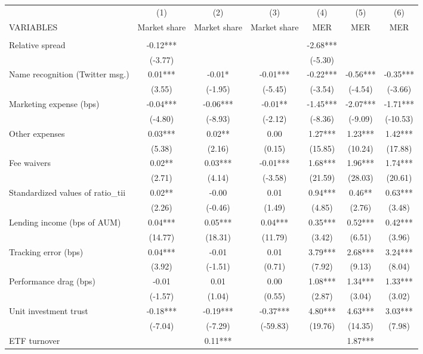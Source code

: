 \documentclass[]{article}
\begin{document}
\begin{tabular}{lcccccc} \hline
 & (1) & (2) & (3) & (4) & (5) & (6) \\
VARIABLES & Market share & Market share & Market share & MER & MER & MER \\ \hline
 &  &  &  &  &  &  \\
Relative spread & -0.12*** &  &  & -2.68*** &  &  \\
 & (-3.77) &  &  & (-5.30) &  &  \\
Name recognition (Twitter msg.) & 0.01*** & -0.01* & -0.01*** & -0.22*** & -0.56*** & -0.35*** \\
 & (3.55) & (-1.95) & (-5.45) & (-3.54) & (-4.54) & (-3.66) \\
Marketing expense (bps) & -0.04*** & -0.06*** & -0.01** & -1.45*** & -2.07*** & -1.71*** \\
 & (-4.80) & (-8.93) & (-2.12) & (-8.36) & (-9.09) & (-10.53) \\
Other expenses & 0.03*** & 0.02** & 0.00 & 1.27*** & 1.23*** & 1.42*** \\
 & (5.38) & (2.16) & (0.15) & (15.85) & (10.24) & (17.88) \\
Fee waivers & 0.02** & 0.03*** & -0.01*** & 1.68*** & 1.96*** & 1.74*** \\
 & (2.71) & (4.14) & (-3.58) & (21.59) & (28.03) & (20.61) \\
Standardized values of ratio\_tii & 0.02** & -0.00 & 0.01 & 0.94*** & 0.46** & 0.63*** \\
 & (2.26) & (-0.46) & (1.49) & (4.85) & (2.76) & (3.48) \\
Lending income (bps of AUM) & 0.04*** & 0.05*** & 0.04*** & 0.35*** & 0.52*** & 0.42*** \\
 & (14.77) & (18.31) & (11.79) & (3.42) & (6.51) & (3.96) \\
Tracking error (bps) & 0.04*** & -0.01 & 0.01 & 3.79*** & 2.68*** & 3.24*** \\
 & (3.92) & (-1.51) & (0.71) & (7.92) & (9.13) & (8.04) \\
Performance drag (bps) & -0.01 & 0.01 & 0.00 & 1.08*** & 1.34*** & 1.33*** \\
 & (-1.57) & (1.04) & (0.55) & (2.87) & (3.04) & (3.02) \\
Unit investment trust & -0.18*** & -0.19*** & -0.37*** & 4.80*** & 4.63*** & 3.03*** \\
 & (-7.04) & (-7.29) & (-59.83) & (19.76) & (14.35) & (7.98) \\
ETF turnover &  & 0.11*** &  &  & 1.87*** &  \\

\end{tabular}
\end{document}
